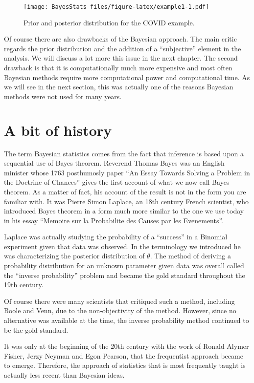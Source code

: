 \documentclass[
]{book}
\begin{document}
\begin{figure}
\centering
\texttt{[image: BayesStats\_files/figure-latex/example1-1.pdf]}
\caption{\label{fig:example1}Prior and posterior distribution for the COVID example.}
\end{figure}

Of course there are also drawbacks of the Bayesian approach. The main critic regards the prior distribution and the addition of a ``subjective'' element in the analysis. We will discuss a lot more this issue in the next chapter. The second drawback is that it is computationally much more expensive and most often Bayesian methods require more computational power and computational time. As we will see in the next section, this was actually one of the reasons Bayesian methods were not used for many years.

\hypertarget{a-bit-of-history}{%
\section{A bit of history}\label{a-bit-of-history}}

The term Bayesian statistics comes from the fact that inference is based upon a sequential use of Bayes theorem. Reverend Thomas Bayes was an English minister whose 1763 posthumosly paper ``An Essay Towards Solving a Problem in the Doctrine of Chances'' gives the first account of what we now call Bayes theorem. As a matter of fact, his account of the result is not in the form you are familiar with. It was Pierre Simon Laplace, an 18th century French scientist, who introduced Bayes theorem in a form much more similar to the one we use today in his essay ``Memoire sur la Probabilite des Causes par les Evenements''.

Laplace was actually studying the probability of a ``success'' in a Binomial experiment given that data was observed. In the terminology we introduced he was characterizing the posterior distribution of \(\theta\). The method of deriving a probability distribution for an unknown parameter given data was overall called the ``inverse probability'' problem and became the gold standard throughout the 19th century.

Of course there were many scientists that critiqued such a method, including Boole and Venn, due to the non-objectivity of the method. However, since no alternative was available at the time, the inverse probability method continued to be the gold-standard.

It was only at the beginning of the 20th century with the work of Ronald Alymer Fisher, Jerzy Neyman and Egon Pearson, that the frequentist approach became to emerge. Therefore, the approach of statistics that is most frequently taught is actually less recent than Bayesian ideas.
\end{document}
